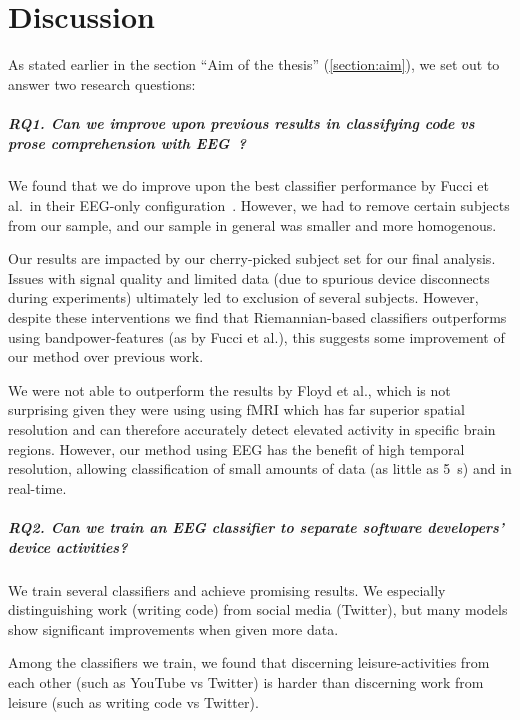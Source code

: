 \chapter{Discussion}\label{section:discussion}

As stated earlier in the section ``Aim of the thesis'' (\ref{section:aim}), we set out to answer two research questions:

\paragraph*{RQ1. Can we improve upon previous results in classifying code vs prose comprehension with EEG~?}

We found that we do improve upon the best classifier performance by Fucci et al.\ in their EEG-only configuration~\cite{fucci_replication_2019}. However, we had to remove certain subjects from our sample, and our sample in general was smaller and more homogenous. 

Our results are impacted by our cherry-picked subject set for our final analysis. Issues with signal quality and limited data (due to spurious device disconnects during experiments) ultimately led to exclusion of several subjects. However, despite these interventions we find that Riemannian-based classifiers outperforms using bandpower-features (as by Fucci et al.), this suggests some improvement of our method over previous work.

We were not able to outperform the results by Floyd et al., which is not surprising given they were using using fMRI which has far superior spatial resolution and can therefore accurately detect elevated activity in specific brain regions. However, our method using EEG has the benefit of high temporal resolution, allowing classification of small amounts of data (as little as \SI{5}{\second}) and in real-time.

\paragraph*{RQ2. Can we train an EEG classifier to separate software developers’ device activities?}

We train several classifiers and achieve promising results. We especially distinguishing work (writing code) from social media (Twitter), but many models show significant improvements when given more data.

Among the classifiers we train, we found that discerning leisure-activities from each other (such as YouTube vs Twitter) is harder than discerning work from leisure (such as writing code vs Twitter).

